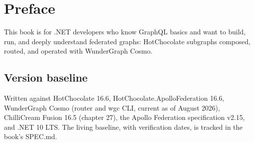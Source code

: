 \chapter{Preface}
\label{ch:preface}


This book is for .NET developers who know GraphQL basics and want to build,
run, and deeply understand federated graphs: HotChocolate subgraphs composed,
routed, and operated with WunderGraph Cosmo.

\section*{Version baseline}

Written against HotChocolate 16.6, HotChocolate.ApolloFederation 16.6,
WunderGraph Cosmo (router and wgc CLI, current as of August 2026), ChilliCream
Fusion 16.5 (chapter 27), the Apollo Federation specification v2.15, and
.NET 10 LTS. The living baseline, with verification dates, is tracked in the
book's SPEC.md.
